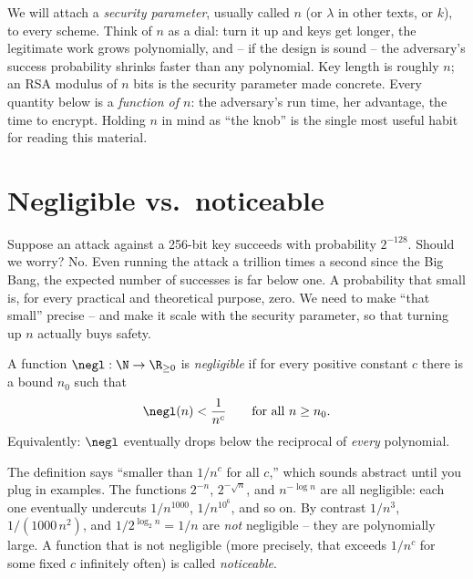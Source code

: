 \begin{focusbox}
We will attach a \emph{security parameter}, usually called $n$ (or $\lambda$ in other texts, or $k$), to every scheme. Think of $n$ as a dial: turn it up and keys get longer, the legitimate work grows polynomially, and -- if the design is sound -- the adversary's success probability shrinks faster than any polynomial. Key length is roughly $n$; an RSA modulus of $n$ bits is the security parameter made concrete. Every quantity below is a \emph{function of $n$}: the adversary's run time, her advantage, the time to encrypt. Holding $n$ in mind as ``the knob'' is the single most useful habit for reading this material.
\end{focusbox}

\section{Negligible vs.\ noticeable}
\label{ch08:negligible}

Suppose an attack against a 256-bit key succeeds with probability $2^{-128}$. Should we worry? No. Even running the attack a trillion times a second since the Big Bang, the expected number of successes is far below one. A probability that small is, for every practical and theoretical purpose, zero. We need to make ``that small'' precise -- and make it scale with the security parameter, so that turning up $n$ actually buys safety.

\begin{definition}
\label{ch08:def-negl}
A function $\negl : \N \to \R_{\ge 0}$ is \emph{negligible} if for every positive constant $c$ there is a bound $n_0$ such that
\[
\negl(n) < \frac{1}{n^{c}} \qquad \text{for all } n \ge n_0 .
\]
Equivalently: $\negl$ eventually drops below the reciprocal of \emph{every} polynomial.
\end{definition}

The definition says ``smaller than $1/n^{c}$ for all $c$,'' which sounds abstract until you plug in examples. The functions $2^{-n}$, $2^{-\sqrt n}$, and $n^{-\log n}$ are all negligible: each one eventually undercuts $1/n^{1000}$, $1/n^{10^6}$, and so on. By contrast $1/n^{3}$, $1/(1000\,n^2)$, and $1/2^{\log_2 n} = 1/n$ are \emph{not} negligible -- they are polynomially large. A function that is not negligible (more precisely, that exceeds $1/n^c$ for some fixed $c$ infinitely often) is called \emph{noticeable}.

